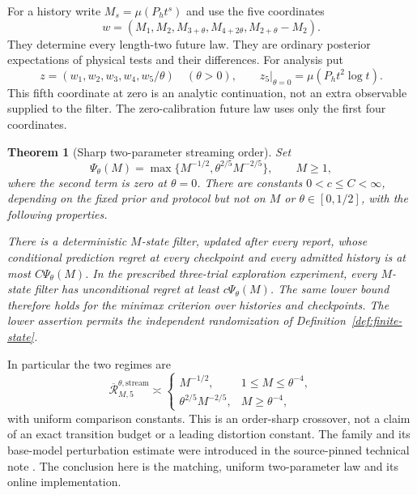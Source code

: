\documentclass[11pt]{amsart}
\newtheorem{theorem}{Theorem}[section]
\theoremstyle{definition}\newtheorem{definition}[theorem]{Definition}
\theoremstyle{remark}\newtheorem{remark}[theorem]{Remark}
\begin{document}
For a history write $M_s=\mu(P_h t^s)$ and use the five coordinates
\begin{equation}\label{eq:five-physical-coordinates}
 w=(M_1,M_2,M_{3+\theta},M_{4+2\theta},M_{2+\theta}-M_2).
\end{equation}
They determine every length-two future law. They are ordinary posterior
expectations of physical tests and their differences. For analysis put
\begin{equation}\label{eq:five-desingularized}
 z=(w_1,w_2,w_3,w_4,w_5/\theta)\quad(\theta>0),
 \qquad z_5\big|_{\theta=0}=\mu(P_h t^2\log t).
\end{equation}
This fifth coordinate at zero is an analytic continuation, not an extra
observable supplied to the filter. The zero-calibration future law uses
only the first four coordinates.

\begin{theorem}[Sharp two-parameter streaming order]\label{thm:uniform-streaming}
Set
\begin{equation}\label{eq:five-resolution}
 \Psi_\theta(M)=\max\{M^{-1/2},\theta^{2/5}M^{-2/5}\},
 \qquad M\ge1,
\end{equation}
where the second term is zero at $\theta=0$. There are constants
$0<c\le C<\infty$, depending on the fixed prior and protocol but not on
$M$ or $\theta\in[0,1/2]$, with the following properties.

There is a deterministic $M$-state filter, updated after every report,
whose conditional prediction regret at every checkpoint and every
admitted history is at most $C\Psi_\theta(M)$. In the prescribed
three-trial exploration experiment, every $M$-state filter has
unconditional regret at least $c\Psi_\theta(M)$. The same lower bound
therefore holds for the minimax criterion over histories and checkpoints.
The lower assertion permits the independent randomization of
Definition~\ref{def:finite-state}.
\end{theorem}

In particular the two regimes are
\begin{equation}\label{eq:two-regimes}
 \overline{\mathcal R}^{\theta,\mathrm{stream}}_{M,5}\asymp
 \begin{cases}
 M^{-1/2},&1\le M\le\theta^{-4},\\
 \theta^{2/5}M^{-2/5},&M\ge\theta^{-4},
 \end{cases}
\end{equation}
with uniform comparison constants. This is an order-sharp crossover, not
a claim of an exact transition budget or a leading distortion constant.
The family and its base-model perturbation estimate were introduced in
the source-pinned technical note \cite{A1v6note}. The conclusion here is
the matching, uniform two-parameter law and its online implementation.
\end{document}
